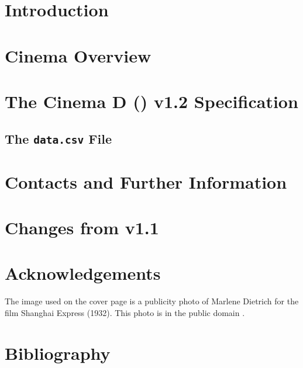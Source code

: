 \documentclass{article}
\newcommand{\version}[0]{1.2\xspace}
\begin{document}
\renewcommand\Authands{ and } 
 
\setcounter{secnumdepth}{5} 
\setcounter{tocdepth}{5} 
\newcommand{\subsubsubsection}[1]{\paragraph{#1}} 




\section{Introduction}
\label{intro}


\section{Cinema Overview}
\label{overview}


\newpage
\section{The Cinema D (\dietrich) v\version Specification}
\label{dietrich}


\subsection{The \texttt{data.csv} File}
\label{csv}


\section{Contacts and Further Information}
\label{contacts}


\section{Changes from v1.1}
\label{changes}


\section{Acknowledgements}
The image used on the cover page is a publicity photo of Marlene Dietrich for the film Shanghai Express (1932). This  photo is in the public domain \cite{dietrich}.

\newpage
\section{Bibliography}


\end{document}
